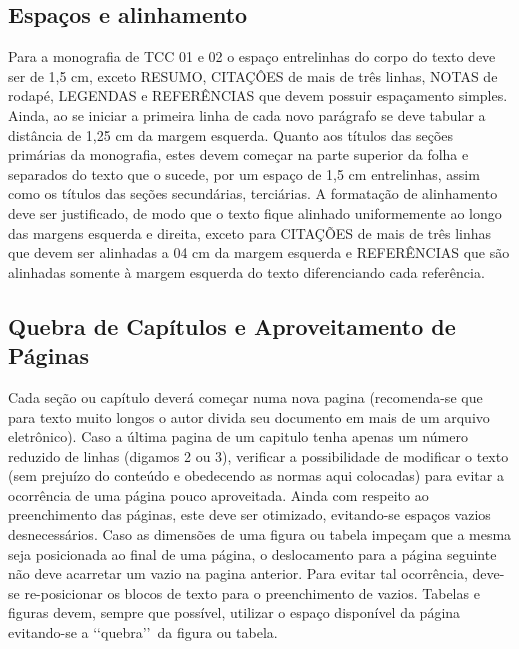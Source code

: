 \subsection{Espaços e alinhamento}
Para a monografia de TCC 01 e 02 o espaço entrelinhas do corpo do texto
deve ser de 1,5 cm, exceto RESUMO, CITAÇÔES de mais de três linhas, NOTAS
de rodapé, LEGENDAS e REFERÊNCIAS que devem possuir espaçamento simples.
Ainda, ao se iniciar a primeira linha de cada novo parágrafo se deve
tabular a distância de 1,25 cm da margem esquerda.
Quanto aos títulos das seções primárias da monografia, estes devem começar
na parte superior da folha e separados do texto que o sucede, por um espaço
de 1,5 cm entrelinhas, assim como os títulos das seções secundárias,
terciárias.
A formatação de alinhamento deve ser justificado, de modo que o texto fique
alinhado uniformemente ao longo das margens esquerda e direita, exceto para
CITAÇÕES de mais de três linhas que devem ser alinhadas a 04 cm da margem
esquerda e REFERÊNCIAS que são alinhadas somente à margem esquerda do texto
diferenciando cada referência.
\subsection{Quebra de Capítulos e Aproveitamento de Páginas}
Cada seção ou capítulo deverá começar numa nova pagina (recomenda-se que
para texto muito longos o autor divida seu documento em mais de um arquivo
eletrônico).
Caso a última pagina de um capitulo tenha apenas um número reduzido de
linhas (digamos 2 ou 3), verificar a possibilidade de modificar o texto
(sem prejuízo do conteúdo e obedecendo as normas aqui colocadas) para
evitar a ocorrência de uma página pouco aproveitada.
Ainda com respeito ao preenchimento das páginas, este deve ser otimizado,
evitando-se espaços vazios desnecessários.
Caso as dimensões de uma figura ou tabela impeçam que a mesma seja
posicionada ao final de uma página, o deslocamento para a página seguinte
não deve acarretar um vazio na pagina anterior. Para evitar tal ocorrência,
deve-se re-posicionar os blocos de texto para o preenchimento de vazios.
Tabelas e figuras devem, sempre que possível, utilizar o espaço disponível
da página evitando-se a \lq\lq quebra\rq\rq\ da figura ou tabela.
